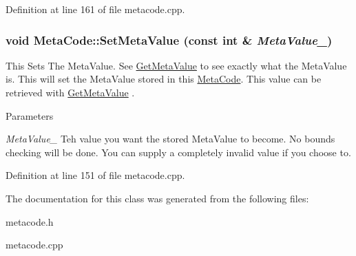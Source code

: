 Definition at line 161 of file metacode.cpp.\hypertarget{classMetaCode_a1e410df95815b4d7e94b971bb1b8ba1e}{
\subsubsection[{SetMetaValue}]{\setlength{\rightskip}{0pt plus 5cm}void MetaCode::SetMetaValue (const int \& {\em MetaValue\_\-})}}
\label{d7/d72/classMetaCode_a1e410df95815b4d7e94b971bb1b8ba1e}


This Sets The MetaValue. See \hyperlink{classMetaCode_a8d9cd9709ab51323d7061cf7b0ea4ee2}{GetMetaValue} to see exactly what the MetaValue is. This will set the MetaValue stored in this \hyperlink{classMetaCode}{MetaCode}. This value can be retrieved with \hyperlink{classMetaCode_a8d9cd9709ab51323d7061cf7b0ea4ee2}{GetMetaValue} . 
\begin{DoxyParams}{Parameters}
\item[{\em MetaValue\_\-}]Teh value you want the stored MetaValue to become. No bounds checking will be done. You can supply a completely invalid value if you choose to. \end{DoxyParams}


Definition at line 151 of file metacode.cpp.

The documentation for this class was generated from the following files:\begin{DoxyCompactItemize}
\item 
metacode.h\item 
metacode.cpp\end{DoxyCompactItemize}
